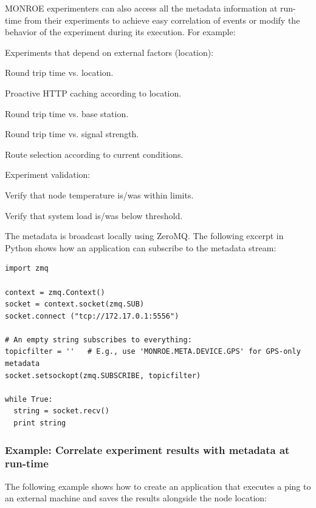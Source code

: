 \documentclass[a4paper,10pt]{article}
\newcommand{\VerbatimFont}{\footnotesize}
\newcommand{\monroe}{MONROE}
\begin{document}
\monroe{} experimenters can also access all the metadata information at run-time from their experiments to achieve easy correlation of events or modify the behavior of the experiment during its execution. For example:
\begin{itemize*}
	\item Experiments that depend on external factors (location):
	\begin{itemize*}
		\item Round trip time vs. location.
		\item Proactive HTTP caching according to location.
		\item Round trip time vs. base station.
		\item Round trip time vs. signal strength.
		\item Route selection according to current conditions.
	\end{itemize*}
	\item Experiment validation:
	\begin{itemize*}
		\item Verify that node temperature is/was within limits.
		\item Verify that system load is/was below threshold.
	\end{itemize*}	
\end{itemize*}

The metadata is broadcast locally using ZeroMQ.
The following excerpt in Python shows how an application can subscribe to the metadata stream:
{\VerbatimFont
\begin{verbatim}
import zmq

context = zmq.Context()
socket = context.socket(zmq.SUB)
socket.connect ("tcp://172.17.0.1:5556")

# An empty string subscribes to everything:
topicfilter = ''   # E.g., use 'MONROE.META.DEVICE.GPS' for GPS-only metadata
socket.setsockopt(zmq.SUBSCRIBE, topicfilter)

while True:
  string = socket.recv()
  print string
\end{verbatim}
}

\subsubsection{Example: Correlate experiment results with metadata at run-time}

The following example shows how to create an application that executes a ping to an external machine and saves the results alongside the node location:
\end{document}
